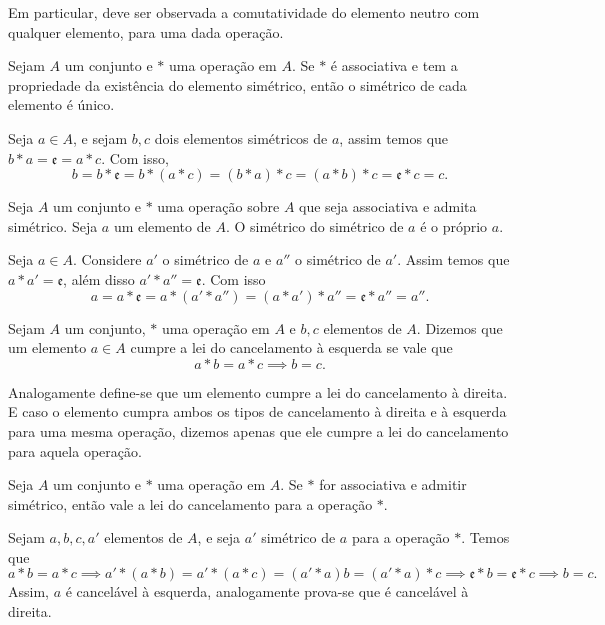 \documentclass[../main.tex]{subfiles}
\begin{document}
Em particular, deve ser observada a comutatividade do elemento neutro com qualquer elemento, para uma dada operação.

\begin{teo}\label{agb-teo-simetricoUnico}
    Sejam $A$ um conjunto e $*$ uma operação em $A$. Se $*$ é associativa e tem a propriedade da existência do elemento simétrico, então o simétrico de cada elemento é único.
\end{teo}
\begin{dem}
    Seja $a \in A$, e sejam $b, c$ dois elementos simétricos de $a$, assim temos que $b*a = \mathfrak{e} = a*c$. 
    Com isso, 
    \[ b = b * \mathfrak{e} = b * (a * c) = (b * a) * c = ( a * b ) * c = \mathfrak{e} * c = c. \]
\end{dem}

\begin{prop}\label{agb-prop-simetricoSimetrico}
    Seja $A$ um conjunto e $*$ uma operação sobre $A$ que seja associativa e admita simétrico. Seja $a$ um elemento de $A$. O simétrico do simétrico de $a$ é o próprio $a$. 
\end{prop}
\begin{dem}
    Seja $a \in A$. Considere $a'$ o simétrico de $a$ e $a''$ o simétrico de $a'$. Assim temos que $a * a' = \mathfrak{e}$, além disso $a' * a'' = \mathfrak{e}$.
    Com isso 
    \[ a = a * \mathfrak{e} = a * (a' * a'') = (a * a') * a'' = \mathfrak{e} * a'' = a''. \]
\end{dem}
\begin{defi}
    Sejam $A$ um conjunto, $*$ uma operação em $A$ e $b,c$ elementos de $A$. Dizemos que um elemento $a \in A$ cumpre a lei do cancelamento à esquerda se vale que \[ a*b=a*c \implies b=c. \]
\end{defi}
    Analogamente define-se que um elemento cumpre a lei do cancelamento à direita. E caso o elemento cumpra ambos os tipos de cancelamento à direita e à esquerda para uma mesma operação, dizemos apenas que ele cumpre a lei do cancelamento para aquela operação.
\begin{teo}\label{agb-teo-leiCancelamento}
    Seja $A$ um conjunto e $*$ uma operação em $A$. Se $*$ for associativa e admitir simétrico, então vale a lei do cancelamento para a operação $*$.
\end{teo}
\begin{dem}
    Sejam $a,b,c,a'$ elementos de $A$, e seja $a'$ simétrico de $a$ para a operação $*$. Temos que 
    \[a*b = a*c \implies a' * (a * b) = a' *(a*c) = (a' * a ) b = (a'*a)*c \implies \mathfrak{e} * b = \mathfrak{e} * c \implies b = c. \] 
    Assim, $a$ é cancelável à esquerda, analogamente prova-se que é cancelável à direita.
\end{dem}
\end{document}
